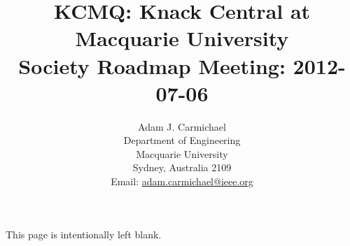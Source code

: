 \title{
  KCMQ: Knack Central at Macquarie University \\
  Society Roadmap Meeting: 2012-07-06
}
%
\author{
  Adam J. Carmichael \\
  Department of Engineering\\
  Macquarie University\\
  Sydney, Australia 2109\\
  Email: \url{adam.carmichael@ieee.org}
}%
%

%
\maketitle
%
\tableofcontents
\chapter{}
\vspace*{\fill}
\begin{center}
This page is intentionally left blank.
\end{center}
\vspace*{\fill}





